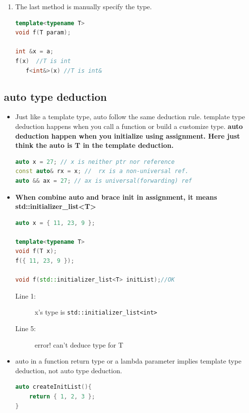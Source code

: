 \documentclass[a4paper,11pt,twoside]{book}
\begin{document}
\begin{enumerate}
	\item The last method is manually specify the type.  
\begin{lstlisting}[frame=single, language=c++]
template<typename T>
void f(T param); 
	
int &x = a;
f(x)  //T is int
   f<int&>(x) //T is int&
\end{lstlisting}
	
\end{enumerate}


\subsection{auto type deduction}
\begin{itemize}
	\item Just like a template type, auto follow the same deduction rule. template type deduction happens when you call a function or build a customize type. \textbf{auto deduction happen when you initialize using assignment. Here just think the auto is T in the template deduction.}
	
\begin{lstlisting}[frame=single, language=c++]
auto x = 27; // x is neither ptr nor reference
const auto& rx = x; //  rx is a non-universal ref.
auto && ax = 27; // ax is universal(forwarding) ref
\end{lstlisting}
	
	\item \textbf{When combine auto and brace init in assignment, it means std::initializer\_list<T>}
	
\begin{lstlisting}[frame=single, language=c++]
auto x = { 11, 23, 9 }; 

template<typename T> 
void f(T x);
f({ 11, 23, 9 }); 
	
void f(std::initializer_list<T> initList);//OK
\end{lstlisting}
\begin{description}
	\item[Line 1:] x's type is  \texttt{std::initializer\_list<int>}
	\item[Line 5:] error! can't deduce type for T
\end{description}
	
	\item auto in a function return type or a lambda parameter implies template type deduction, not auto type deduction.
\begin{lstlisting}[frame=single, language=c++]
auto createInitList(){
	return { 1, 2, 3 }; 
}
	

\end{lstlisting}
\end{itemize}
\end{document}
